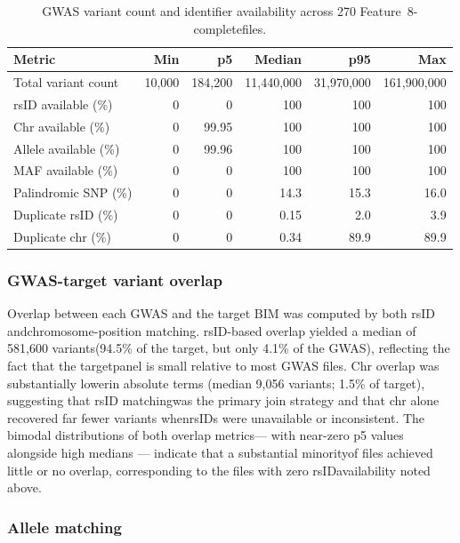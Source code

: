 \documentclass[11pt,a4paper]{article}
\begin{document}
\begin{table}[h]
\centering
\caption{GWAS variant count and identifier availability across 270 Feature~8-completefiles.}
\label{tab}
\begin{tabular}{lrrrrr}
\toprule
Metric & Min & p5 & Median & p95 & Max \\
\midrule
Total variant count      & 10,000 & 184,200 & 11,440,000 & 31,970,000 & 161,900,000 \\
rsID available (\%)      & 0      & 0       & 100        & 100        & 100         \\
Chr available (\%)   & 0      & 99.95   & 100        & 100        & 100 \\
Allele available (\%)    & 0      & 99.96   & 100        & 100        & 100         \\
MAF available (\%)       & 0      & 0       & 100        & 100        & 100         \\
Palindromic SNP (\%)     & 0      & 0       & 14.3       & 15.3       & 16.0 \\
Duplicate rsID (\%)      & 0      & 0       & 0.15       & 2.0        & 3.9 \\
Duplicate chr (\%)   & 0      & 0       & 0.34       & 89.9       & 89.9        \\
\bottomrule
\end{tabular}
\end{table}

\subsubsection*{GWAS-target variant overlap}

Overlap between each GWAS and the target BIM was computed by both rsID andchromosome-position matching. rsID-based overlap yielded a median of 581,600 variants(94.5\% of the target, but only 4.1\% of the GWAS), reflecting the fact that the targetpanel is small relative to most GWAS files. Chr overlap was substantially lowerin absolute terms (median 9,056 variants; 1.5\% of target), suggesting that rsID matchingwas the primary join strategy and that chr alone recovered far fewer variants whenrsIDs were unavailable or inconsistent. The bimodal distributions of both overlap metrics— with near-zero p5 values alongside high medians — indicate that a substantial minorityof files achieved little or no overlap, corresponding to the files with zero rsIDavailability noted above.

\subsubsection*{Allele matching}
\end{document}
